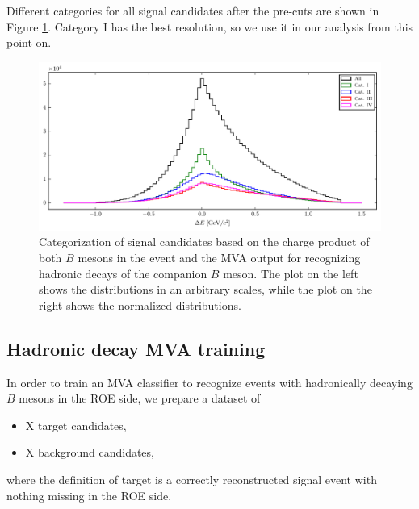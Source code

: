 \documentclass[oneside,a4paper,openany,12pt]{scrbook}
\begin{document}
Different categories for all signal candidates after the pre-cuts are shown in Figure \ref{fig:sig_categ}. Category I has the best resolution, so we use it in our analysis from this point on.

\begin{figure}[H]
\centering
\captionsetup{width=0.8\linewidth}
\includegraphics[width=\linewidth]{fig/sig_categ}
\caption{Categorization of signal candidates based on the charge product of both $B$ mesons in the event and the MVA output for recognizing hadronic decays of the companion $B$ meson. The plot on the left shows the distributions in an arbitrary scales, while the plot on the right shows the normalized distributions.}
\label{fig:sig_categ}
\end{figure}


\subsection{Hadronic decay MVA training}
\label{subs:HDMVA}

In order to train an MVA classifier to recognize events with hadronically decaying $B$ mesons in the ROE side, we prepare a dataset of
\begin{itemize}
\item X target candidates,
\item X background candidates,
\end{itemize}
where the definition of target is a correctly reconstructed signal event with nothing missing in the ROE side. 
\end{document}
